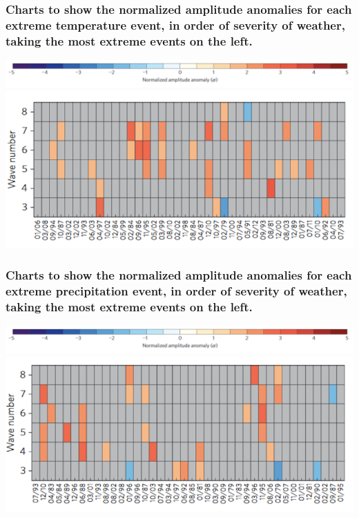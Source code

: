 \documentclass{beamer}
\begin{document}
\begin{frame}
\frametitle{Charts to show the normalized amplitude anomalies for each extreme temperature event, in order of severity of weather, taking the most extreme events on the left.}
\centering
\includegraphics[scale=0.4]{Cathie4}
\includegraphics[scale=0.7]{Cathie5}
\end{frame}
\begin{frame}
\frametitle{Charts to show the normalized amplitude anomalies for each extreme precipitation event, in order of severity of weather, taking the most extreme events on the left.}
\centering
\includegraphics[scale=0.4]{Cathie4}
\includegraphics[scale=0.7]{Cathie6}
\end{frame}
\end{document}
